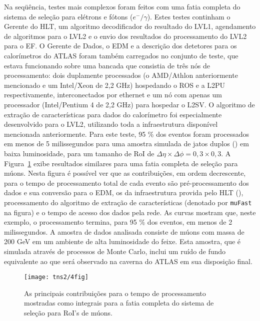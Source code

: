 Na seqüência, testes mais complexos foram feitos com uma fatia completa do
sistema de seleção para elétrons e fótons ($e^-/\gamma$). Estes testes
continham o Gerente do HLT, um algoritmo decodificador do resultado do LVL1,
agendamento de algoritmos para o LVL2 e o envio dos resultados do
processamento do LVL2 para o EF. O Gerente de Dados, o EDM e a descrição dos
detetores para os calorímetros do ATLAS foram também carregados no conjunto de
teste, que estava funcionando sobre uma bancada que consistia de três nós de
processamento: dois duplamente processados (o AMD/Athlon anteriormente
mencionado e um Intel/Xeon de 2,2 GHz) hospedando o ROS e a L2PU
respectivamente, interconectados por
 ethernet e um nó com apenas um processador (Intel/Pentium 4 de
2,2 GHz) para hospedar o L2SV. O algoritmo de extração de características para
dados do calorímetro foi especialmente desenvolvido para o LVL2, utilizando
toda a infraestrutura disponível mencionada anteriormente. Para este teste, 95
\% dos eventos foram processados em menos de 5 milissegundos para uma amostra
simulada de jatos duplos () em baixa luminosidade, para um
tamanho de RoI de $\Delta\eta \times \Delta\phi = 0,3 \times 0,3$. A
Figura~\ref{fig:l2sc-mu} exibe resultados similares para uma fatia completa de
seleção para múons. Nesta figura é possível ver que as contribuições, em ordem
decrescente, para o tempo de processamento total de cada evento são
pré-processamento dos dados e sua conversão para o EDM, os  da
infraestrutura provida pelo HLT (), processamento do algoritmo
de extração de características (denotado por \texttt{muFast} na figura) e o
tempo de acesso dos dados pela rede. As curvas mostram que, neste exemplo, o
processamento termina, para 95 \% dos eventos, em menos de 2 milissegundos. A
amostra de dados analisada consiste de múons com massa de 200 GeV em um
ambiente de alta luminosidade do feixe. Esta amostra, que é simulada através
de processos de Monte Carlo, inclui um ruído de fundo equivalente ao que será
observado na caverna do ATLAS em sua disposição final.

\begin{figure}
\begin{center}
\texttt{[image: tns2/4fig]}
\end{center}
\caption{As principais contribuições para o tempo de processamento mostradas
como integrais para a fatia completa do sistema de seleção para RoI's de
múons.}
\label{fig:l2sc-mu}
\end{figure}



